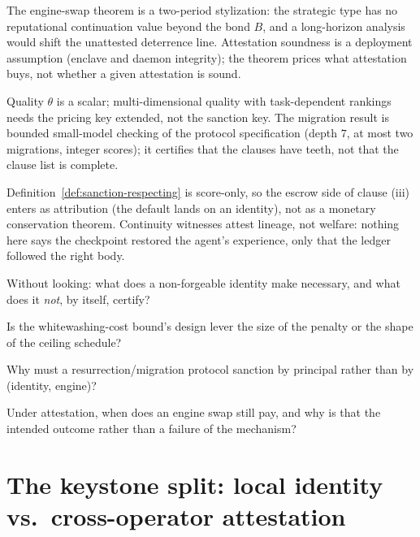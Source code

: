 \documentclass[11pt,a4paper]{article}
\theoremstyle{definition}
\newcounter{protocol}[section]
\begin{document}
\begin{pdboundary}
\setlength{\parskip}{4pt plus 1pt}
The engine-swap theorem is a two-period stylization: the strategic type has no
reputational continuation value beyond the bond $B$, and a long-horizon
analysis would shift the unattested deterrence line. Attestation soundness is
a deployment assumption (enclave and daemon integrity); the theorem prices
what attestation buys, not whether a given attestation is sound. 

Quality
$\theta$ is a scalar; multi-dimensional quality with task-dependent rankings
needs the pricing key extended, not the sanction key. The migration result is
bounded small-model checking of the protocol specification (depth $7$, at
most two migrations, integer scores); it certifies that the clauses have
teeth, not that the clause list is complete.


Definition~\ref{def:sanction-respecting} is score-only, so the escrow side of
clause (iii) enters as attribution (the default lands on an identity), not as
a monetary conservation theorem. Continuity witnesses attest lineage, not
welfare: nothing here says the checkpoint restored the agent's experience,
only that the ledger followed the right body.
\end{pdboundary}

\pdexercisepointer*{\ref{ex:stp-property-reality}}{\ref{ex:stp-resurrection-soundness}}{\pageref{ex:stp-property-reality}}

\begin{pdrecitation}
\item Without looking: what does a non-forgeable identity make necessary, and
what does it \emph{not}, by itself, certify?
\item Is the whitewashing-cost bound's design lever the size of the penalty
or the shape of the ceiling schedule?
\item Why must a resurrection/migration protocol sanction by principal rather
than by (identity, engine)?
\item Under attestation, when does an engine swap still pay, and why is that
the intended outcome rather than a failure of the mechanism?
\end{pdrecitation}

\section{The keystone split: local identity vs.\ cross-operator attestation}\label{sec:keystone}
\end{document}
